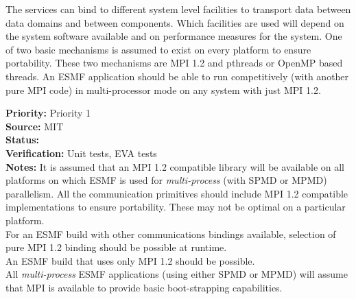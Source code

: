 The {\bf \shortname} services can bind to different system level facilities
to transport data between data domains and between components.
Which facilities are used will depend on the system software available and
on performance measures for the system. One of two basic mechanisms is assumed to
exist on every platform to ensure portability. These two mechanisms
are MPI 1.2 and pthreads or OpenMP based threads. An ESMF application
should be able to run competitively (with another pure MPI code) in multi-processor 
mode on any system with just MPI 1.2.

\begin{reqlist}
{\bf Priority:} Priority 1 \\
{\bf Source:}  MIT \\
{\bf Status:}  \\
{\bf Verification:} Unit tests, EVA tests \\
{\bf Notes:} It is assumed that an MPI 1.2 compatible library
will be available on all platforms on which ESMF is used for {\it multi-process}
(with SPMD or MPMD) parallelism. All the {\bf \shortname} 
communication primitives should include MPI 1.2 compatible implementations
to ensure portability. These may not be optimal on a particular
platform.\\
For an ESMF build with other communications bindings available,
selection of pure MPI 1.2 binding should be possible at runtime.\\
An ESMF build that uses only MPI 1.2 should be possible.\\
All {\it multi-process} ESMF applications (using either SPMD or MPMD)
will assume that MPI is available to provide basic boot-strapping
capabilities.
\end{reqlist}

